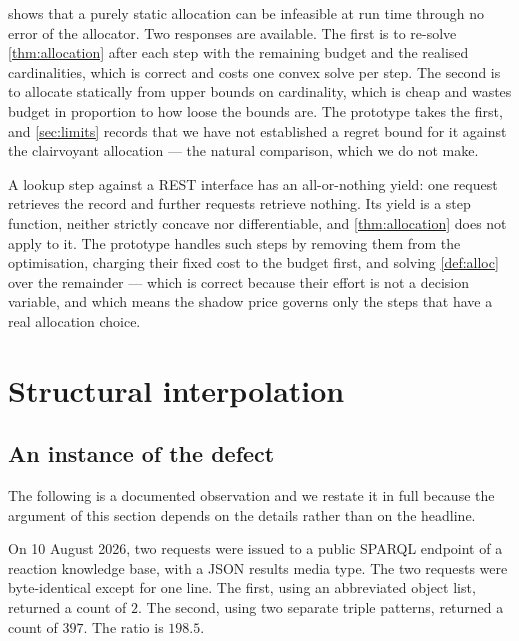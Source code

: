 \begin{remark}
\label{rem:replanning}
 shows that a purely static allocation can
be infeasible at run time through no error of the allocator. Two responses are
available. The first is to re-solve \cref{thm:allocation} after each step with
the remaining budget and the realised cardinalities, which is correct and costs
one convex solve per step. The second is to allocate statically from upper
bounds on cardinality, which is cheap and wastes budget in proportion to how
loose the bounds are. The prototype takes the first, and \cref{sec:limits}
records that we have not established a regret bound for it against the
clairvoyant allocation --- the natural comparison, which we do not make.
\end{remark}

\begin{remark}
\label{rem:concavity-fails}
A \textsf{lookup} step against a REST interface has an all-or-nothing yield:
one request retrieves the record and further requests retrieve nothing. Its
yield is a step function, neither strictly concave nor differentiable, and
\cref{thm:allocation} does not apply to it. The prototype handles such steps by
removing them from the optimisation, charging their fixed cost to the budget
first, and solving \cref{def:alloc} over the remainder --- which is correct
because their effort is not a decision variable, and which means the shadow
price governs only the steps that have a real allocation choice.
\end{remark}

\section{Structural interpolation}
\label{sec:interp}

\subsection{An instance of the defect}

The following is a documented observation and we restate it in full because the
argument of this section depends on the details rather than on the headline.

\begin{observation}
\label{obs:2-397}
On 10 August 2026, two requests were issued to a public SPARQL endpoint of a
reaction knowledge base, with a JSON results media type. The two requests were
byte-identical except for one line. The first, using an abbreviated object
list, returned a count of $2$. The second, using two separate triple patterns,
returned a count of $397$. The ratio is $198.5$.
\end{observation}

